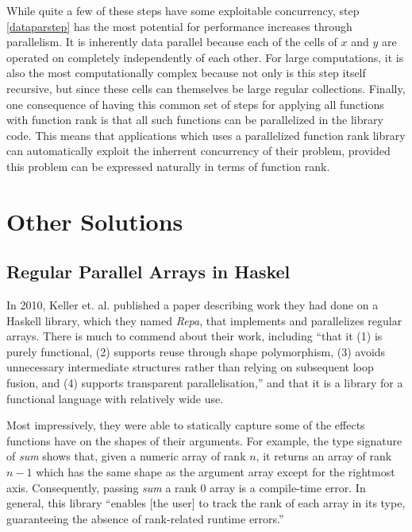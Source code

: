 While quite a few of these steps have some exploitable concurrency, 
step \ref{dataparstep} has the most potential for performance increases through parallelism.
It is inherently data parallel because each of the cells of $x$ and $y$ are operated on completely independently of each other.
For large computations, it is also the most computationally complex 
because not only is this step itself recursive, but
since these cells can themselves be large regular collections.
Finally, one consequence of having this common set of steps for applying all functions with function rank is
that all such functions can be parallelized in the library code.
This means that applications which uses a parallelized function rank library can automatically exploit the inherrent concurrency of their problem, 
provided this problem can be expressed naturally in terms of function rank.

\section{Other Solutions}
\subsection{Regular Parallel Arrays in Haskel}
In 2010, Keller et. al. published a paper\cite{dph} 
describing work they had done on a Haskell library, which they named \textit{Repa}, that implements and parallelizes regular arrays.
There is much to commend about their work, including ``that it (1) is purely
functional, (2) supports reuse through shape polymorphism, (3)
avoids unnecessary intermediate structures rather than relying on
subsequent loop fusion, and (4) supports transparent parallelisation,''
and that it is a library for a functional language with relatively wide use.

Most impressively, they were able to statically capture some of the effects functions have on the shapes of their arguments.
For example, the type signature of \textit{sum} shows that, given a numeric array of rank $n$, 
it returns an array of rank $n-1$ which has the same shape as the argument array except for the rightmost axis.
Consequently, passing \textit{sum} a rank 0 array is a compile-time error.
In general, this library ``enables [the user] to track the rank of each array in its type,
guaranteeing the absence of rank-related runtime errors.''

